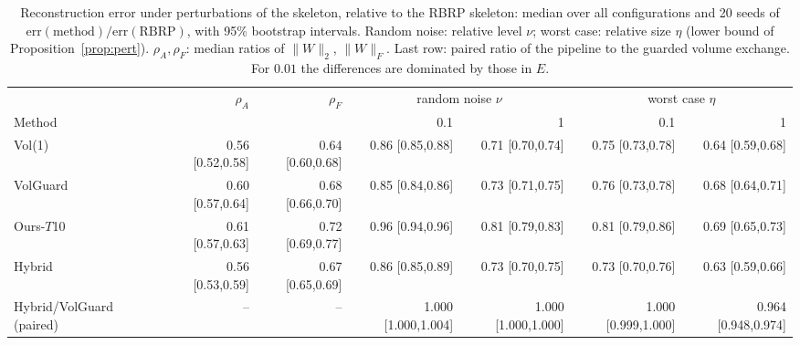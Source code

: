 \begin{table}[t]
\centering\small
\caption{Reconstruction error under perturbations of the skeleton, relative to the RBRP skeleton: median over all configurations and 20 seeds of $\mathrm{err}(\text{method})/\mathrm{err}(\text{RBRP})$, with 95\% bootstrap intervals. Random noise: relative level $\nu$; worst case: relative size $\eta$ (lower bound of Proposition~\ref{prop:pert}). $\rho_A,\rho_F$: median ratios of $\|W\|_2$, $\|W\|_F$. Last row: paired ratio of the pipeline to the guarded volume exchange. For $0.01$ the differences are dominated by those in $E$.}\label{tab:noise}
\begin{adjustbox}{max width=\linewidth}
\begin{tabular}{lrrrrrr}
\toprule
 & $\rho_A$ & $\rho_F$ & \multicolumn{2}{c}{random noise $\nu$} & \multicolumn{2}{c}{worst case $\eta$}\\
\cmidrule(lr){4-5}\cmidrule(lr){6-7}
Method & & & 0.1 & 1 & 0.1 & 1 \\
\midrule
Vol(1) & 0.56 [0.52,0.58] & 0.64 [0.60,0.68] & 0.86 [0.85,0.88] & 0.71 [0.70,0.74] & 0.75 [0.73,0.78] & 0.64 [0.59,0.68] \\
VolGuard & 0.60 [0.57,0.64] & 0.68 [0.66,0.70] & 0.85 [0.84,0.86] & 0.73 [0.71,0.75] & 0.76 [0.73,0.78] & 0.68 [0.64,0.71] \\
Ours-$T$10 & 0.61 [0.57,0.63] & 0.72 [0.69,0.77] & 0.96 [0.94,0.96] & 0.81 [0.79,0.83] & 0.81 [0.79,0.86] & 0.69 [0.65,0.73] \\
Hybrid & 0.56 [0.53,0.59] & 0.67 [0.65,0.69] & 0.86 [0.85,0.89] & 0.73 [0.70,0.75] & 0.73 [0.70,0.76] & 0.63 [0.59,0.66] \\
Hybrid/VolGuard (paired) & -- & -- & 1.000 [1.000,1.004] & 1.000 [1.000,1.000] & 1.000 [0.999,1.000] & 0.964 [0.948,0.974] \\
\bottomrule
\end{tabular}
\end{adjustbox}
\end{table}
